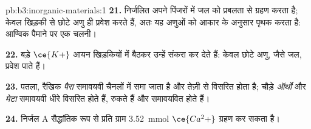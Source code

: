 \begin{solution}{pb:b3:inorganic-materials:1}
\textbf{21.} निर्जलित  अपने पिंजरों में जल को प्रबलता से ग्रहण करता है; केवल
खिड़की से छोटे अणु ही प्रवेश करते हैं, अतः यह अणुओं को आकार के अनुसार पृथक करता है:
आण्विक पैमाने पर एक चलनी।

\textbf{22.} बड़े $\ce{K+}$ आयन खिड़कियों में बैठकर उन्हें संकरा कर देते हैं: केवल छोटे
अणु, जैसे जल, प्रवेश पाते हैं।

\textbf{23.} पतला, रैखिक \textit{पैरा} समावयवी चैनलों में समा जाता है और तेज़ी से विसरित होता है;
चौड़े \textit{ऑर्थो} और \textit{मेटा} समावयवी धीरे विसरित होते हैं, रुकते हैं और समावयवित होते हैं।

\textbf{24.} निर्जल  A सैद्धांतिक रूप से प्रति ग्राम \qty{3.52}{mmol} $\ce{Ca^2+}$ ग्रहण कर सकता है।
\end{solution}
